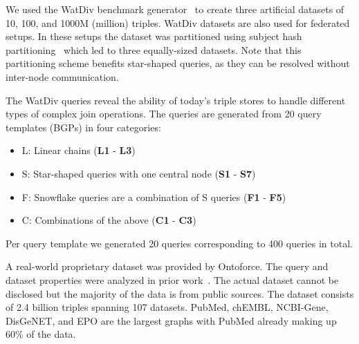 

We used the  WatDiv benchmark generator~\cite{alucc2014diversified} to create three artificial datasets of 10, 100, and 1000M (million) triples. 
WatDiv datasets are also used for federated setups. 
In these setups the dataset was partitioned using subject hash partitioning~\cite{Zeng, Harth} which led to three equally-sized datasets.
Note that this partitioning scheme benefits star-shaped queries, as they can be resolved without inter-node communication.

The WatDiv queries reveal the ability of today's triple stores to handle different types of complex join operations.
The queries are generated from 20 query templates (BGPs) in four categories: 
\begin{itemize}
	\item L: Linear chains (\textbf{L1} - \textbf{L3})
	\item S: Star-shaped queries with one central node (\textbf{S1} - \textbf{S7})
	\item F: Snowflake queries are a combination of S queries (\textbf{F1} - \textbf{F5})
	\item C: Combinations of the above (\textbf{C1} - \textbf{C3})
\end{itemize}
Per query template we generated 20 queries corresponding to 400 queries in total. 

A real-world proprietary dataset was provided by Ontoforce. 
The query and dataset properties were analyzed in prior work~\cite{dewitte_swat4ls_2016}. The actual dataset cannot be disclosed but the majority of the data is from public sources. The dataset consists of 2.4 billion triples spanning 107 datasets. 
PubMed, chEMBL, NCBI-Gene, DisGeNET, and EPO are the largest graphs with PubMed already making up 60\% of the data. 

